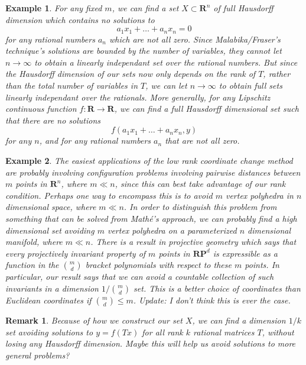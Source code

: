 \documentclass{report}
\theoremstyle{plain}
\newtheorem*{example}{Example}
\theoremstyle{plain}
\newtheorem*{remark}{Remark}
\begin{document}
\begin{example}
For any fixed $m$, we can find a set $X \subset \mathbf{R}^n$ of full Hausdorff dimension which contains no solutions to
%
\[ a_1x_1 + \dots + a_nx_n = 0 \]
%
for {\it any} rational numbers $a_n$ which are not all zero. Since Malabika/Fraser's technique's solutions are bounded by the number of variables, they cannot let $n \to \infty$ to obtain a linearly independant set over the rational numbers. But since the Hausdorff dimension of our sets now only depends on the rank of $T$, rather than the total number of variables in $T$, we can let $n \to \infty$ to obtain full sets linearly independant over the rationals. More generally, for any Lipschitz continuous function $f: \mathbf{R} \to \mathbf{R}$, we can find a full Hausdorff dimensional set such that there are no solutions
%
\[ f(a_1x_1 + \dots + a_nx_n, y) \]
%
for any $n$, and for any rational numbers $a_n$ that are not all zero.
\end{example}

\begin{example}
The easiest applications of the low rank coordinate change method are probably involving configuration problems involving pairwise distances between $m$ points in $\mathbf{R}^n$, where $m \ll n$, since this can best take advantage of our rank condition. Perhaps one way to encompass this is to avoid $m$ vertex polyhedra in $n$ dimensional space, where $m \ll n$. In order to distinguish this problem from something that can be solved from Math\'{e}'s approach, we can probably find a high dimensional set avoiding $m$ vertex polyhedra on a parameterized $n$ dimensional manifold, where $m \ll n$. There is a result in projective geometry which says that every projectively invariant property of $m$ points in $\mathbf{RP}^d$ is expressible as a function in the ${m \choose d}$ bracket polynomials with respect to these $m$ points. In particular, our result says that we can avoid a countable collection of such invariants in a dimension $1/{m \choose d}$ set. This is a better choice of coordinates than Euclidean coordinates if ${m \choose d} \leq m$. Update: I don't think this is ever the case.
\end{example}

\begin{remark}
    Because of how we construct our set $X$, we can find a dimension $1/k$ set avoiding solutions to $y = f(Tx)$ for {\it all} rank $k$ rational matrices $T$, without losing any Hausdorff dimension. Maybe this will help us avoid solutions to more general problems?
\end{remark}
\end{document}
